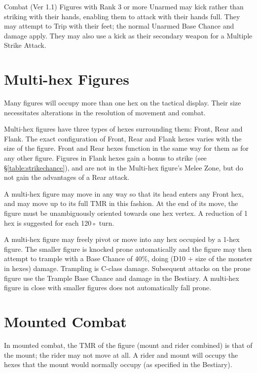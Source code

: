 \begin{Chapter}{Combat (Ver 1.1)}
Figures with Rank 3 or more Unarmed may kick rather than striking with
their hands, enabling them to attack with their hands full. They may
attempt to Trip with their feet; the normal Unarmed Base Chance and
damage apply.  They may also use a kick as their secondary weapon for
a Multiple Strike Attack.

\section{Multi-hex Figures}
\label{combat:multihex}

Many figures will occupy more than one hex on the tactical display.
Their size necessitates alterations in the resolution of movement and
combat.

Multi-hex figures have three types of hexes surrounding them: Front,
Rear and Flank.  The exact configuration of Front, Rear and Flank
hexes varies with the size of the figure.  Front and Rear hexes
function in the same way for them as for any other figure.  Figures in
Flank hexes gain a bonus to strike (see \S\ref{table:strikechance}),
and are not in the Multi-hex figure’s Melee Zone, but do not gain the
advantages of a Rear attack.

A multi-hex figure may move in any way so that its head enters any
Front hex, and may move up to its full TMR in this fashion.  At the
end of its move, the figure must be unambiguously oriented towards one
hex vertex.  A reduction of 1 hex is suggested for each 120◦ turn.

A multi-hex figure may freely pivot or move into any hex occupied by a
1-hex figure.  The smaller figure is knocked prone automatically and
the figure may then attempt to trample with a Base Chance of 40\%,
doing (D10 + size of the monster in hexes) damage.  Trampling is
C-class damage.  Subsequent attacks on the prone figure use the
Trample Base Chance and damage in the Bestiary.  A multi-hex figure in
close with smaller figures does not automatically fall prone.

\section{Mounted Combat}
\label{combat:mounted}

In mounted combat, the TMR of the figure (mount and rider combined) is
that of the mount; the rider may not move at all.  A rider and mount
will occupy the hexes that the mount would normally occupy (as
specified in the Bestiary).


\end{Chapter}
